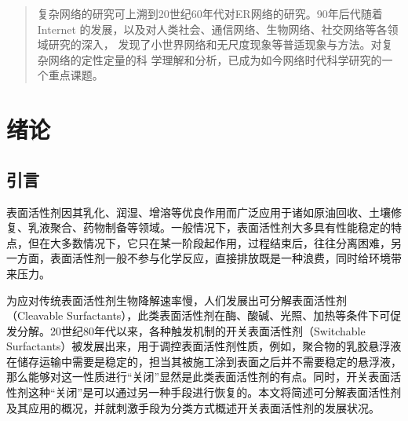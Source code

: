 \documentclass[bachelor,winfonts]{jnuthesis}
\author{陈育明}
\institute{江南大学}
\begin{document}
    \maketitle
    \frontmatter
    \begin{abstract}
        复杂网络的研究可上溯到20世纪60年代对ER网络的研究。90年后代随着Internet
        的发展，以及对人类社会、通信网络、生物网络、社交网络等各领域研究的深入，
        发现了小世界网络和无尺度现象等普适现象与方法。对复杂网络的定性定量的科
        学理解和分析，已成为如今网络时代科学研究的一个重点课题。
    \end{abstract}
    
    \begin{englishabstract}
        \blindtext
    \end{englishabstract}
    
    \tableofcontents
    
    \mainmatter
    
    \chapter{绪论}\label{chapter_introduction}
    \section{引言}
    表面活性剂因其乳化、润湿、增溶等优良作用而广泛应用于诸如原油回收、土壤修复、乳液聚合、药物制备等领域\cite{秦勇2009}。一般情况下，表面活性剂大多具有性能稳定的特点，但在大多数情况下，它只在某一阶段起作用，过程结束后，往往分离困难，另一方面，表面活性剂一般不参与化学反应，直接排放既是一种浪费，同时给环境带来压力\cite{秦勇2009}。
    
    为应对传统表面活性剂生物降解速率慢，人们发展出可分解表面活性剂（Cleavable Surfactants），此类表面活性剂在酶、酸碱、光照、加热等条件下可促发分解\cite{hellberg2000}。20世纪80年代以来，各种触发机制的开关表面活性剂（Switchable Surfactants）被发展出来，用于调控表面活性剂性质，例如，聚合物的乳胶悬浮液在储存运输中需要是稳定的，担当其被施工涂到表面之后并不需要稳定的悬浮液，那么能够对这一性质进行“关闭”显然是此类表面活性剂的有点\cite{jessop2012}。同时，开关表面活性剂这种“关闭”是可以通过另一种手段进行恢复的。本文将简述可分解表面活性剂及其应用的概况，并就刺激手段为分类方式概述开关表面活性剂的发展状况。
    
\end{document}
